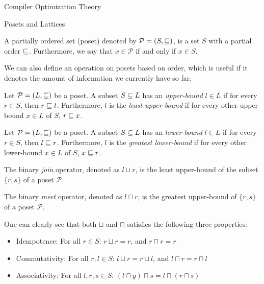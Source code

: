 \begin{section}{Compiler Optimization Theory}
\begin{subsection}{Posets and Lattices}
\begin{definition}
\begin{itemize}
A partially ordered set (poset) denoted by $\mathcal{P} = (S, \sqsubseteq)$, is a
set $S$ with a partial order $\sqsubseteq$. Furthermore, we say that $x \in \mathcal{P}$
if and only if $x \in S$.
\end{itemize}
\end{definition}

We can also define an operation on posets based on order, which is useful if
it denotes the amount of information we currently have so far.

\begin{definition}
Let $\mathcal{P} = (L, \sqsubseteq)$ be a poset. A subset $S \subseteq L$ has an
\textit{upper-bound} $l \in L$ if for every $r \in S$, then $r \sqsubseteq l$.
Furthermore, $l$ is the \textit{least upper-bound} if for every other
upper-bound $x \in L$ of $S$, $r \sqsubseteq x$.
\end{definition}

\begin{definition}
Let $\mathcal{P} = (L, \sqsubseteq)$ be a poset. A subset $S \subseteq L$ has an
\textit{lower-bound} $l \in L$ if for every $r \in S$, then $l \sqsubseteq r$.
Furthermore, $l$ is the \textit{greatest lower-bound} if for every other
lower-bound $x \in L$ of $S$, $x \sqsubseteq r$.
\end{definition}

\begin{definition}
The binary \textit{join} operator, denoted as $l \sqcup r$, is the
least upper-bound of the subset $\{r, s\}$ of a poset $\mathcal{P}$.
\end{definition}

\begin{definition}
The binary \textit{meet} operator, denoted as $l \sqcap r$, is the
greatest upper-bound of $\{r, s\}$ of a poset $\mathcal{P}$.
\end{definition}

One can clearly see that both $\sqcup$ and $\sqcap$ satisfies the
following three properties:

\begin{itemize}
	\item Idempotence: For all $r \in S$: $r \sqcup r = r$, and $r \sqcap r = r$ 
	\item Commutativity: For all $r, l \in S$: $l \sqcup r = r \sqcup l$, and
	$l \sqcap r = r \sqcap l$
	\item Associativity: For all $l, r, s \in S$: $(l \sqcap y) \sqcap s = l \sqcap (r \sqcap s)$
\end{itemize}


\end{subsection}
\end{section}
